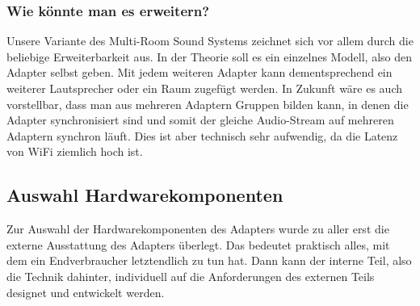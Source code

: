 \documentclass[]{article}
\begin{document}
\subsubsection{Wie könnte man es erweitern?}
Unsere Variante des Multi-Room Sound Systems zeichnet sich vor allem durch die beliebige Erweiterbarkeit aus. In der Theorie soll es ein einzelnes Modell, also den Adapter selbst geben. Mit jedem weiteren Adapter kann dementsprechend ein weiterer Lautsprecher oder ein Raum zugefügt werden. In Zukunft wäre es auch vorstellbar, dass man aus mehreren Adaptern Gruppen bilden kann, in denen die Adapter synchronisiert sind und somit der gleiche Audio-Stream auf mehreren Adaptern synchron läuft. Dies ist aber technisch sehr aufwendig, da die Latenz von WiFi ziemlich hoch ist.
\subsection{Auswahl Hardwarekomponenten}
Zur Auswahl der Hardwarekomponenten des Adapters wurde zu aller erst die externe Ausstattung des Adapters überlegt. Das bedeutet praktisch alles, mit dem ein Endverbraucher letztendlich zu tun hat. Dann kann der interne Teil, also die Technik dahinter, individuell auf die Anforderungen des externen Teils designet und entwickelt werden.
\end{document}
